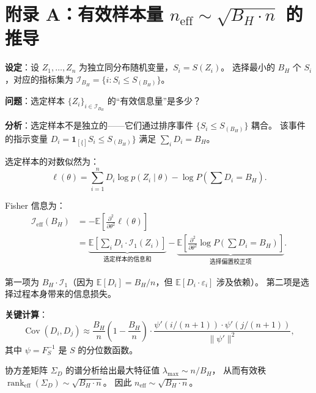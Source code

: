 \documentclass[12pt,a4paper]{article}
\newcommand{\E}{\mathbb{E}}
\newcommand{\cI}{\mathcal{I}}
\newcommand{\ind}[1]{\mathbf{1}_{[#1]}}
\newcommand{\Cov}{\operatorname{Cov}}
\newcommand{\rank}{\operatorname{rank}}
\newcommand{\Fisher}{\mathcal{I}}
\begin{document}
\section{附录 A：有效样本量 $n_{\mathrm{eff}} \sim \sqrt{B_H \cdot n}$ 的推导}

{\small
\textbf{设定}：设 $Z_1, \dots, Z_n$ 为独立同分布随机变量，$S_i = S(Z_i)$。
选择最小的 $B_H$ 个 $S_i$，对应的指标集为 $\cI_{B_H} = \{i: S_i \leq S_{(B_H)}\}$。

\textbf{问题}：选定样本 $\{Z_i\}_{i \in \cI_{B_H}}$ 的``有效信息量''是多少？

\textbf{分析}：选定样本不是独立的——它们通过排序事件 $\{S_i \leq S_{(B_H)}\}$ 耦合。
该事件的指示变量 $D_i = \ind\{S_i \leq S_{(B_H)}\}$ 满足 $\sum_i D_i = B_H$。

选定样本的对数似然为：
\begin{equation}
    \ell(\theta) = \sum_{i=1}^n D_i \log p(Z_i \mid \theta) - \log P(\sum D_i = B_H).
\end{equation}

Fisher 信息为：
\begin{align}
    \Fisher_{\mathrm{eff}}(B_H)
    &= -\E\left[ \frac{\partial^2}{\partial\theta^2} \ell(\theta) \right] \\
    &= \underbrace{\E\left[ \sum_i D_i \cdot \Fisher_1(Z_i) \right]}_{\text{选定样本的信息和}}
       - \underbrace{\E\left[ \frac{\partial^2}{\partial\theta^2}
          \log P(\sum D_i = B_H) \right]}_{\text{选择偏置校正项}}.
\end{align}

第一项为 $B_H \cdot \Fisher_1$（因为 $\E[D_i] = B_H/n$，但 $\E[D_i \cdot \varepsilon_i]$ 涉及依赖）。
第二项是选择过程本身带来的信息损失。

\textbf{关键计算}：
\begin{equation}
    \Cov(D_i, D_j) \approx \frac{B_H}{n} \left(1 - \frac{B_H}{n}\right) \cdot
    \frac{\psi'(i/(n+1)) \cdot \psi'(j/(n+1))}{\|\psi'\|^2},
\end{equation}
其中 $\psi = F_S^{-1}$ 是 $S$ 的分位数函数。

协方差矩阵 $\Sigma_D$ 的谱分析给出最大特征值 $\lambda_{\max} \sim n/B_H$，
从而有效秩 $\rank_{\mathrm{eff}}(\Sigma_D) \sim \sqrt{B_H \cdot n}$。
因此 $n_{\mathrm{eff}} \sim \sqrt{B_H \cdot n}$。}
\end{document}
